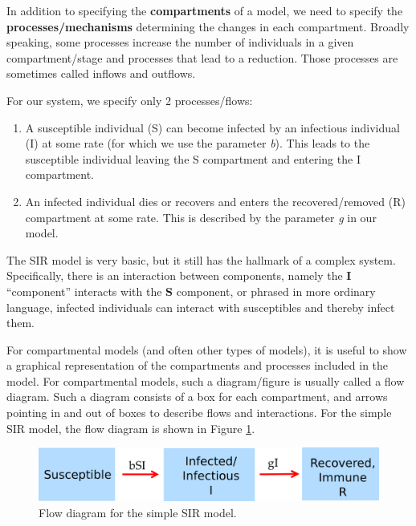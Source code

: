 \documentclass[]{article}
\providecommand{\tightlist}{%
  \setlength{\itemsep}{0pt}\setlength{\parskip}{0pt}}
\theoremstyle{definition}
\theoremstyle{definition}
\theoremstyle{definition}
\theoremstyle{remark}
\begin{document}
In addition to specifying the \textbf{compartments} of a model, we need
to specify the \textbf{processes/mechanisms} determining the changes in
each compartment. Broadly speaking, some processes increase the number
of individuals in a given compartment/stage and processes that lead to a
reduction. Those processes are sometimes called inflows and outflows.

For our system, we specify only 2 processes/flows:

\begin{enumerate}
\def\labelenumi{\arabic{enumi}.}
\tightlist
\item
  A susceptible individual (S) can become infected by an infectious
  individual (I) at some rate (for which we use the parameter \emph{b}).
  This leads to the susceptible individual leaving the S compartment and
  entering the I compartment.\\
\item
  An infected individual dies or recovers and enters the
  recovered/removed (R) compartment at some rate. This is described by
  the parameter \emph{g} in our model.
\end{enumerate}

The SIR model is very basic, but it still has the hallmark of a complex
system. Specifically, there is an interaction between components, namely
the \textbf{I} ``component'' interacts with the \textbf{S} component, or
phrased in more ordinary language, infected individuals can interact
with susceptibles and thereby infect them.

For compartmental models (and often other types of models), it is useful
to show a graphical representation of the compartments and processes
included in the model. For compartmental models, such a diagram/figure
is usually called a flow diagram. Such a diagram consists of a box for
each compartment, and arrows pointing in and out of boxes to describe
flows and interactions. For the simple SIR model, the flow diagram is
shown in Figure \ref{fig:basicSIR}.

\begin{figure}
\centering
\includegraphics{./images/basicSIRmodelfigure.png}
\caption{\label{fig:basicSIR}Flow diagram for the simple SIR model.}
\end{figure}
\end{document}
